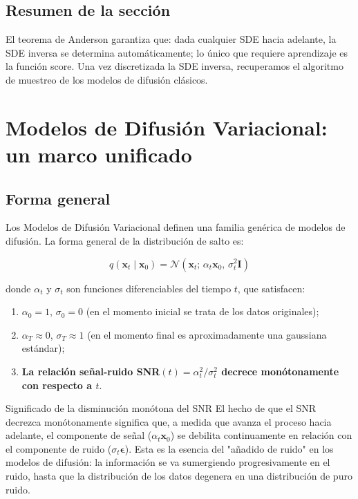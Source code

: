 \documentclass[a4paper]{article}
\begin{document}
\subsection{Resumen de la sección}

El teorema de Anderson garantiza que: dada cualquier SDE hacia adelante, la SDE inversa se determina automáticamente; lo único que requiere aprendizaje es la función score. Una vez discretizada la SDE inversa, recuperamos el algoritmo de muestreo de los modelos de difusión clásicos.

\section{Modelos de Difusión Variacional: un marco unificado}

\subsection{Forma general}

Los Modelos de Difusión Variacional definen una familia genérica de modelos de difusión. La forma general de la distribución de salto es:

$$
q(\mathbf{x}_t \mid \mathbf{x}_0) = \mathcal{N}\!\left(\mathbf{x}_t;\, \alpha_t \mathbf{x}_0,\, \sigma_t^2 \mathbf{I}\right)
$$

donde $\alpha_t$ y $\sigma_t$ son funciones diferenciables del tiempo $t$, que satisfacen:

\begin{enumerate}
    \item $\alpha_0 = 1$, $\sigma_0 = 0$ (en el momento inicial se trata de los datos originales);
    \item $\alpha_T \approx 0$, $\sigma_T \approx 1$ (en el momento final es aproximadamente una gaussiana estándar);
    \item \textbf{La relación señal-ruido SNR$(t) = \alpha_t^2/\sigma_t^2$ decrece monótonamente con respecto a $t$}.
\end{enumerate}

\begin{importantbox}{Significado de la disminución monótona del SNR}
El hecho de que el SNR decrezca monótonamente significa que, a medida que avanza el proceso hacia adelante, el componente de señal ($\alpha_t \mathbf{x}_0$) se debilita continuamente en relación con el componente de ruido ($\sigma_t \boldsymbol{\epsilon}$). Esta es la esencia del "añadido de ruido" en los modelos de difusión: la información se va sumergiendo progresivamente en el ruido, hasta que la distribución de los datos degenera en una distribución de puro ruido.
\end{importantbox}
\end{document}
